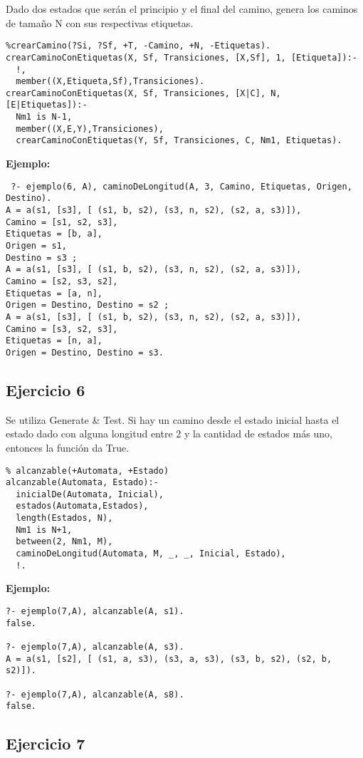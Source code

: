 \documentclass[10pt, a4paper,english,spanish,hidelinks]{article}
\begin{document}
Dado dos estados que serán el principio y el final del camino, genera los caminos de
tamaño N con sus respectivas etiquetas. 

\begin{verbatim}
%crearCamino(?Si, ?Sf, +T, -Camino, +N, -Etiquetas).
crearCaminoConEtiquetas(X, Sf, Transiciones, [X,Sf], 1, [Etiqueta]):-
  !,
  member((X,Etiqueta,Sf),Transiciones).
crearCaminoConEtiquetas(X, Sf, Transiciones, [X|C], N, [E|Etiquetas]):-
  Nm1 is N-1,
  member((X,E,Y),Transiciones),
  crearCaminoConEtiquetas(Y, Sf, Transiciones, C, Nm1, Etiquetas).
\end{verbatim}

\textbf{Ejemplo:}
\begin{verbatim}
 ?- ejemplo(6, A), caminoDeLongitud(A, 3, Camino, Etiquetas, Origen, Destino).
A = a(s1, [s3], [ (s1, b, s2), (s3, n, s2), (s2, a, s3)]),
Camino = [s1, s2, s3],
Etiquetas = [b, a],
Origen = s1,
Destino = s3 ;
A = a(s1, [s3], [ (s1, b, s2), (s3, n, s2), (s2, a, s3)]),
Camino = [s2, s3, s2],
Etiquetas = [a, n],
Origen = Destino, Destino = s2 ;
A = a(s1, [s3], [ (s1, b, s2), (s3, n, s2), (s2, a, s3)]),
Camino = [s3, s2, s3],
Etiquetas = [n, a],
Origen = Destino, Destino = s3.
\end{verbatim}


\subsection{Ejercicio 6}
Se utiliza Generate \& Test.
Si hay un camino desde el estado inicial hasta el estado dado con alguna longitud
entre 2 y la cantidad de estados más uno, entonces la función da True.
\begin{verbatim}
% alcanzable(+Automata, +Estado)
alcanzable(Automata, Estado):-
  inicialDe(Automata, Inicial),
  estados(Automata,Estados),
  length(Estados, N),
  Nm1 is N+1,
  between(2, Nm1, M),
  caminoDeLongitud(Automata, M, _, _, Inicial, Estado),
  !.
\end{verbatim}

\textbf{Ejemplo:}
\begin{verbatim}
?- ejemplo(7,A), alcanzable(A, s1).
false.

?- ejemplo(7,A), alcanzable(A, s3).
A = a(s1, [s2], [ (s1, a, s3), (s3, a, s3), (s3, b, s2), (s2, b, s2)]).

?- ejemplo(7,A), alcanzable(A, s8).
false.
\end{verbatim}


\subsection{Ejercicio 7}
\end{document}
